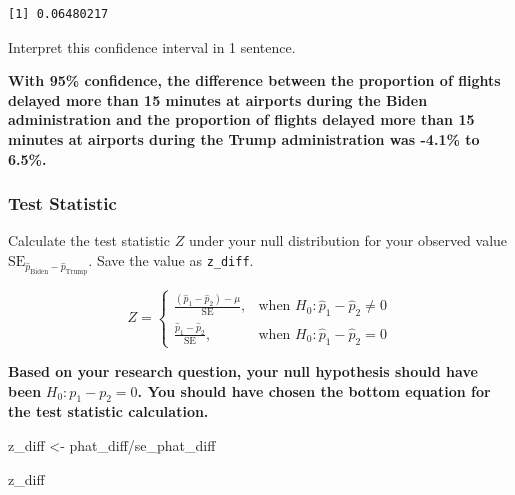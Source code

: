 \documentclass[
  letterpaper,
  DIV=11,
  numbers=noendperiod]{scrartcl}
\newenvironment{Shaded}{\begin{snugshade}}{\end{snugshade}}
\newcommand{\NormalTok}[1]{\textcolor[rgb]{0.00,0.23,0.31}{#1}}
\newcommand{\OtherTok}[1]{\textcolor[rgb]{0.00,0.23,0.31}{#1}}
\newcommand{\SpecialCharTok}[1]{\textcolor[rgb]{0.37,0.37,0.37}{#1}}
\begin{document}
\begin{verbatim}
[1] 0.06480217
\end{verbatim}

Interpret this confidence interval in 1 sentence.

\begin{tcolorbox}[enhanced jigsaw, toprule=.15mm, breakable, leftrule=.75mm, bottomrule=.15mm, rightrule=.15mm, colback=white, opacityback=0, colframe=quarto-callout-warning-color-frame, left=2mm, arc=.35mm]

\textbf{With 95\% confidence, the difference between the proportion of
flights delayed more than 15 minutes at airports during the Biden
administration and the proportion of flights delayed more than 15
minutes at airports during the Trump administration was -4.1\% to
6.5\%.}

\end{tcolorbox}

\subsubsection{Test Statistic}\label{test-statistic}

Calculate the test statistic \(Z\) under your null distribution for your
observed value
\(\text{SE}_{\hat{p}_{\text{Biden}}-\hat{p}_{\text{Trump}}}\). Save the
value as \texttt{z\_diff}.

\[
Z=
\begin{cases}
\frac{(\hat{p}_1-\hat{p}_2)-\mu}{\text{SE}}, & \text{when } H_0\colon \hat{p}_1-\hat{p}_2 \ne 0 \\
\frac{\hat{p}_1-\hat{p}_2}{\text{SE}}, & \text{when } H_0\colon \hat{p}_1-\hat{p}_2 = 0
\end{cases}
\]

\begin{tcolorbox}[enhanced jigsaw, toprule=.15mm, breakable, leftrule=.75mm, bottomrule=.15mm, rightrule=.15mm, colback=white, opacityback=0, colframe=quarto-callout-warning-color-frame, left=2mm, arc=.35mm]

\textbf{Based on your research question, your null hypothesis should
have been} \(H_0: p_1-p_2=0\)\textbf{. You should have chosen the bottom
equation for the test statistic calculation.}

\end{tcolorbox}

\begin{Shaded}
\begin{Highlighting}[]
\NormalTok{z\_diff }\OtherTok{\textless{}{-}}\NormalTok{ phat\_diff}\SpecialCharTok{/}\NormalTok{se\_phat\_diff}

\NormalTok{z\_diff}
\end{Highlighting}
\end{Shaded}
\end{document}

